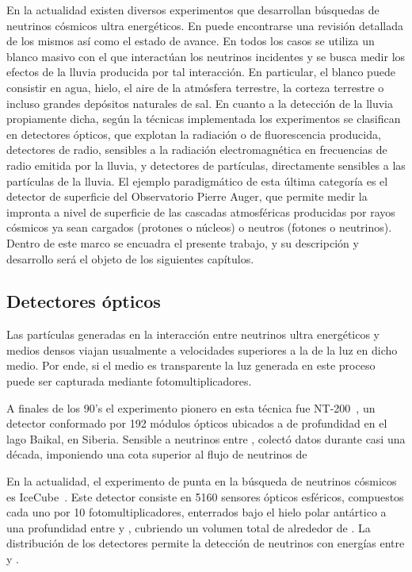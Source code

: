 En la actualidad existen diversos experimentos que desarrollan b\'usquedas de neutrinos c\'osmicos ultra energ\'eticos. 
En \cite{cite:nuSearchReview1} puede encontrarse una revisión detallada de los mismos as\'i como el estado de avance. 
En todos los casos se utiliza un blanco masivo con el que interact\'uan los neutrinos incidentes y se busca medir los efectos de la lluvia producida por tal interacci\'on.
En particular, el blanco puede consistir en agua, hielo, el aire de la atm\'osfera terrestre, la corteza terrestre o incluso grandes dep\'ositos naturales de sal.
En cuanto a la detecci\'on de la lluvia propiamente dicha, seg\'un la t\'ecnicas implementada los experimentos se clasifican en detectores \'opticos, que explotan la radiaci\'on \cher{} o de fluorescencia producida, detectores de radio, sensibles a la radiaci\'on electromagn\'etica en frecuencias de radio emitida por la lluvia, y detectores de part\'iculas, directamente sensibles a las part\'iculas de la lluvia. El ejemplo paradigm\'atico de esta \'ultima categor\'ia es el detector de superficie del Observatorio Pierre Auger, que permite medir la impronta a nivel de superficie de las cascadas atmosf\'ericas  producidas por rayos c\'osmicos ya sean cargados (protones o n\'ucleos) o neutros (fotones o neutrinos). Dentro de este marco se encuadra el presente trabajo, y su descripci\'on y desarrollo ser\'a el objeto de los siguientes cap\'itulos.

	\subsection{Detectores \'opticos}
	Las part\'iculas generadas en la interacci\'on entre neutrinos ultra energ\'eticos y medios densos viajan usualmente a velocidades superiores a la de la luz en dicho medio.
	Por ende, si el medio es transparente la luz \cher{} generada en este proceso puede ser capturada mediante fotomultiplicadores.
	
	A finales de los 90's el experimento pionero en esta t\'ecnica fue NT-200~\cite{cite:nt200}, un detector conformado por 192 m\'odulos \'opticos ubicados a  de profundidad en el lago Baikal, en Siberia.
	Sensible a neutrinos entre , colectó datos durante casi una d\'ecada, imponiendo una cota superior al flujo de neutrinos de 
	
	En la actualidad, el experimento de punta en la b\'usqueda de neutrinos c\'osmicos es IceCube~\cite{cite:IceCube1}.
	Este detector consiste en 5160 sensores \'opticos esf\'ericos, compuestos cada uno por 10 fotomultiplicadores, enterrados bajo el hielo polar ant\'artico a una profundidad entre  y , cubriendo un volumen total de alrededor de .
	La distribuci\'on de los detectores permite la detecci\'on de neutrinos con energ\'ias entre  y .
	

